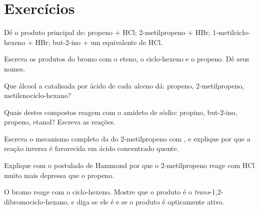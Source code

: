 \section{Exercícios}

\begin{exercise}[$\star$]\label{exo:b1:electrophilic-additions:1}
Dê o produto principal de: propeno + HCl; 2-metilpropeno + HBr;
1-metilciclo-hexeno + HBr; but-2-ino + um equivalente de HCl.
\end{exercise}

\begin{exercise}[$\star$]\label{exo:b1:electrophilic-additions:2}
Escreva os produtos do bromo com o eteno, o ciclo-hexeno e o propeno.
Dê seus nomes.
\end{exercise}

\begin{exercise}[$\star$]\label{exo:b1:electrophilic-additions:3}
Que álcool a  catalisada por ácido de cada alceno dá:
propeno, 2-metilpropeno, metilenociclo-hexano?
\end{exercise}

\begin{exercise}[$\star$]\label{exo:b1:electrophilic-additions:4}
Quais destes compostos reagem com o amideto de sódio: propino, but-2-ino,
propeno, etanol? Escreva as reações.
\end{exercise}

\begin{exercise}[$\star\star$]\label{exo:b1:electrophilic-additions:5}
Escreva o mecanismo completo da  do 2-metilpropeno com , e explique por que a reação inversa é favorecida em ácido
concentrado quente.
\end{exercise}

\begin{exercise}[$\star\star$]\label{exo:b1:electrophilic-additions:6}
Explique com o postulado de Hammond por que o 2-metilpropeno reage com
HCl muito mais depressa que o propeno.
\end{exercise}

\begin{exercise}[$\star\star$]\label{exo:b1:electrophilic-additions:7}
O bromo reage com o ciclo-hexeno. Mostre que o produto é o
\textit{trans}-1,2-dibromociclo-hexano, e diga se ele é  e se o
produto é opticamente ativo.
\end{exercise}

